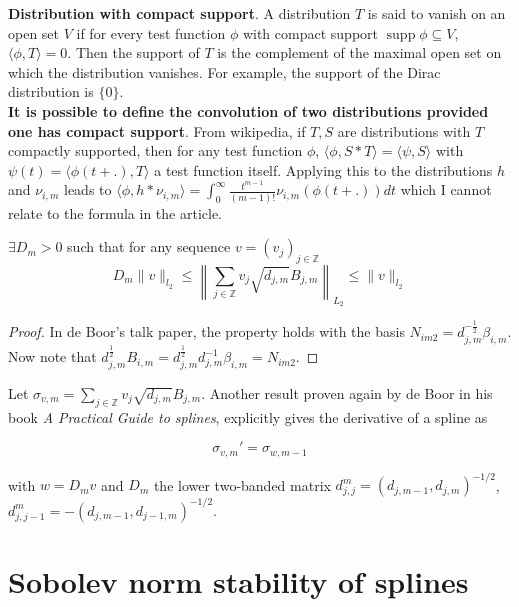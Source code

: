 \documentclass[a4paper, 11pt]{article}
\DeclareMathOperator*{\supp}{supp}
\begin{document}
\textbf{Distribution with compact support}. A distribution $T$ is said to vanish on an open set $V$ if for every test 
function $\phi$ with compact support $\supp \phi \subseteq V$, $\langle \phi, T \rangle = 0$. Then the support of $T$ is 
the complement of the maximal open set on which the distribution vanishes. For example, the support of the Dirac 
distribution is $\{0\}$. \\

\textbf{It is possible to define the convolution of two distributions provided one has compact support}. From wikipedia, 
if $T,S$ are distributions with $T$ compactly supported, then for any test function $\phi$, $\langle \phi, S*T \rangle = 
\langle \psi, S \rangle$ with $\psi(t) = \langle \phi(t+.), T \rangle$ a test function itself. Applying this to the 
distributions $h$ and $\nu_{i,m}$ leads to $\langle \phi, h*\nu_{i,m} \rangle = \int_{0}^{\infty} \frac{t^{m-1}}{(m-1)!} 
\nu_{i,m}(\phi(t+.)) dt$ which I cannot relate to the formula in the article.

\begin{lem}{1}
  $\exists D_m > 0$ such that for any sequence $v = {(v_j)}_{j \in \mathbb{Z}}$
  \begin{equation*}
    D_m \|v\|_{l_2} \leq {\left\| \sum_{j \in \mathbb{Z}} v_j \sqrt{d_{j,m}} B_{j,m} \right\|}_{L_2} \leq \|v\|_{l_2}
  \end{equation*}
\end{lem}

\begin{proof}
  In de Boor's talk paper, the property holds with the basis $N_{im2} = d_{j,m}^{-\frac{1}{2}} \beta_{i,m}$. Now note 
  that $d_{j,m}^{\frac{1}{2}} B_{i,m} = d_{j,m}^{\frac{1}{2}} d_{j,m}^{-1} \beta_{i,m} = N_{im2}$.
\end{proof}

Let $\sigma_{v,m} = \sum_{j \in \mathbb{Z}} v_j \sqrt{d_{j,m}} B_{j,m}$. Another result proven again by de Boor in his 
book \emph{A Practical Guide to splines}, explicitly gives the derivative of a spline as

\begin{equation*}
  \sigma_{v, m}' = \sigma_{w, m-1}
\end{equation*}

with $w = D_m v$ and $D_m$ the lower two-banded matrix $d_{j,j}^m = {(d_{j,m-1}, d_{j,m})}^{-1/2}$, $d_{j, j-1}^m =  
-{(d_{j,m-1}, d_{j-1,m})}^{-1/2}$.

\section{Sobolev norm stability of splines}
\end{document}
